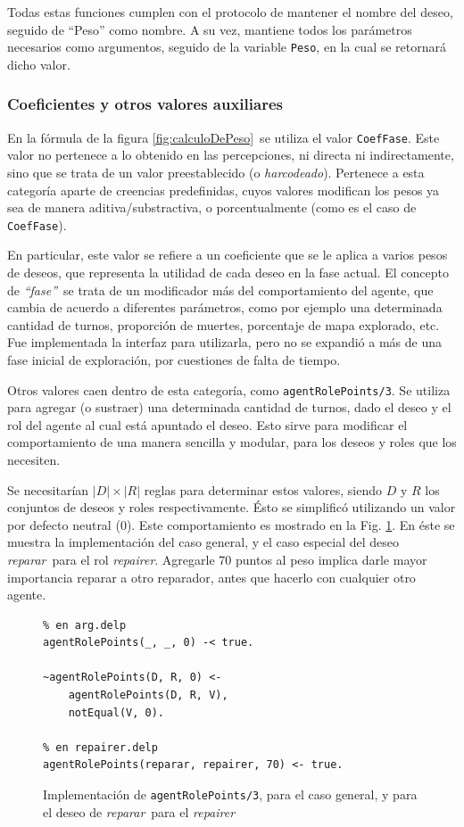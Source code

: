 \documentclass[oneside]{book}
\theoremstyle{definition}
\theoremstyle{example}
\begin{document}
Todas estas funciones cumplen con el protocolo de mantener el nombre del deseo,
seguido de ``Peso'' como nombre. A su vez, mantiene todos los parámetros 
necesarios como argumentos, seguido de la variable \texttt{Peso}, en la cual se 
retornará dicho valor.

\subsubsection{Coeficientes y otros valores auxiliares}

En la fórmula de la figura \ref{fig:calculoDePeso}\ se utiliza el valor 
\texttt{CoefFase}. Este valor no pertenece a lo obtenido en las percepciones, ni
directa ni indirectamente, sino que se trata de un valor preestablecido (o
\textit{harcodeado}). Pertenece a esta categoría aparte de creencias predefinidas,
cuyos valores modifican los pesos ya sea de manera aditiva/substractiva, o 
porcentualmente (como es el caso de \texttt{CoefFase}).

En particular, este valor se refiere a un coeficiente que se le aplica a varios
pesos de deseos, que representa la utilidad de cada deseo en la fase actual. El 
concepto de \textit{``fase''}\ se trata de un modificador más del comportamiento
del agente, que cambia de acuerdo a diferentes parámetros, como por ejemplo una
determinada cantidad de turnos, proporción de muertes, porcentaje de mapa explorado,
etc. Fue implementada la interfaz para utilizarla, pero no se expandió a más de una
fase inicial de exploración, por cuestiones de falta de tiempo.

Otros valores caen dentro de esta categoría, como \texttt{agentRolePoints/3}.
Se utiliza para agregar (o sustraer) una determinada cantidad de turnos, dado el
deseo y el rol del agente al cual está apuntado el deseo. Esto sirve para modificar el 
comportamiento de una manera sencilla y modular, para los deseos y roles que los 
necesiten.

Se necesitarían $|D| \times |R|$ reglas para determinar estos valores, siendo $D$
y $R$ los conjuntos de deseos y roles respectivamente. Ésto se simplificó utilizando
un valor por defecto neutral ($0$). Este comportamiento es mostrado
en la Fig. \ref{fig:agentRolePoints}. En éste se muestra la implementación del caso
general, y el caso especial del deseo \emph{reparar}\ para el rol \emph{repairer}.
Agregarle 70 puntos al peso implica darle mayor importancia reparar a otro reparador,
antes que hacerlo con cualquier otro agente.

\begin{figure}
\begin{verbatim}
% en arg.delp
agentRolePoints(_, _, 0) -< true.
	
~agentRolePoints(D, R, 0) <- 
	agentRolePoints(D, R, V),
	notEqual(V, 0).
    
% en repairer.delp
agentRolePoints(reparar, repairer, 70) <- true.
\end{verbatim}
\caption{Implementación de \texttt{agentRolePoints/3}, para el caso general, y para el 
deseo de \emph{reparar}\ para el \emph{repairer}}
\label{fig:agentRolePoints}
\end{figure}
\end{document}
